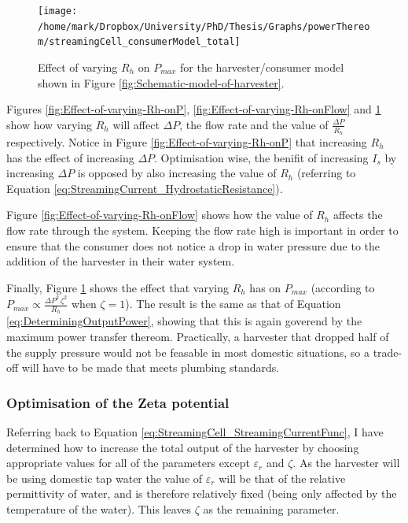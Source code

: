 \begin{figure}
\begin{centering}
\texttt{[image: /home/mark/Dropbox/University/PhD/Thesis/Graphs/powerThereom/streamingCell\_consumerModel\_total]}
\par\end{centering}

\protect\caption{\label{fig:Effect-of-varying-Rh-onIs}Effect of varying $R_{h}$ on
\foreignlanguage{english}{$P_{max}$} for the harvester/consumer model
shown in Figure \ref{fig:Schematic-model-of-harvester}.}
\end{figure}
Figures \ref{fig:Effect-of-varying-Rh-onP}, \ref{fig:Effect-of-varying-Rh-onFlow}
and \ref{fig:Effect-of-varying-Rh-onIs} show how varying $R_{h}$
will affect $\Delta P$, the flow rate and the value of $\frac{\Delta P}{R_{h}}$
respectively. Notice in Figure \ref{fig:Effect-of-varying-Rh-onP}
that increasing $R_{h}$ has the effect of increasing $\Delta P$.
Optimisation wise, the benifit of increasing $I_{s}$ by increasing
$\Delta P$ is opposed by also increasing the value of $R_{h}$ (referring
to Equation \ref{eq:StreamingCurrent_HydrostaticResistance}).

Figure \ref{fig:Effect-of-varying-Rh-onFlow} shows how the value
of $R_{h}$ affects the flow rate through the system. Keeping the
flow rate high is important in order to ensure that the consumer does
not notice a drop in water pressure due to the addition of the harvester
in their water system.

Finally, Figure \ref{fig:Effect-of-varying-Rh-onIs} shows the effect
that varying $R_{h}$ has on \foreignlanguage{english}{$P_{max}$}
(according to $P_{max}\propto\frac{\Delta P^{2}\,\zeta^{2}}{R_{h}}$
when $\zeta=1$). The result is the same as that of Equation \ref{eq:DeterminingOutputPower},
showing that this is again goverend by the maximum power transfer
thereom. Practically, a harvester that dropped half of the supply
pressure would not be feasable in most domestic situations, so a trade-off
will have to be made that meets plumbing standards.


\subsubsection{Optimisation of the Zeta potential}

Referring back to Equation \ref{eq:StreamingCell_StreamingCurrentFunc},
I have determined how to increase the total output of the harvester
by choosing appropriate values for all of the parameters except $\varepsilon_{r}$
and $\zeta$. As the harvester will be using domestic tap water the
value of $\varepsilon_{r}$ will be that of the relative permittivity
of water, and is therefore relatively fixed (being only affected by
the temperature of the water). This leaves $\zeta$ as the remaining
parameter.

